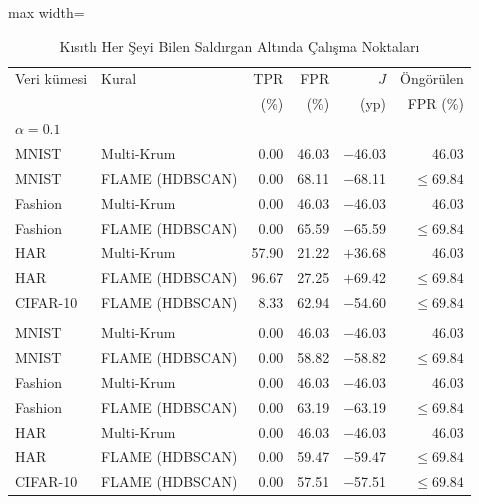 \begin{table}[!t]
\centering\footnotesize
\setlength{\tabcolsep}{4pt}
\caption{Kısıtlı Her Şeyi Bilen Saldırgan Altında Çalışma Noktaları}\label{tab:constrained}
\begin{adjustbox}{max width=\columnwidth}
\begin{tabular}{llrrrr}
\toprule
Veri kümesi & Kural & TPR & FPR & $J$ & Öngörülen \\
 &  & (\%) & (\%) & (yp) & FPR (\%) \\
\midrule
\multicolumn{6}{l}{\emph{$\alpha=0.1$}} \\
\quad MNIST & Multi-Krum & 0.00 & 46.03 & $-$46.03 & 46.03 \\
\quad MNIST & FLAME (HDBSCAN) & 0.00 & 68.11 & $-$68.11 & $\leq69.84$ \\
\quad Fashion & Multi-Krum & 0.00 & 46.03 & $-$46.03 & 46.03 \\
\quad Fashion & FLAME (HDBSCAN) & 0.00 & 65.59 & $-$65.59 & $\leq69.84$ \\
\quad HAR & Multi-Krum & 57.90 & 21.22 & $+$36.68 & 46.03 \\
\quad HAR & FLAME (HDBSCAN) & 96.67 & 27.25 & $+$69.42 & $\leq69.84$ \\
\quad CIFAR-10 & FLAME (HDBSCAN) & 8.33 & 62.94 & $-$54.60 & $\leq69.84$ \\
\addlinespace[3pt]
\multicolumn{6}{l}{\emph{$\alpha=0.01$}} \\
\quad MNIST & Multi-Krum & 0.00 & 46.03 & $-$46.03 & 46.03 \\
\quad MNIST & FLAME (HDBSCAN) & 0.00 & 58.82 & $-$58.82 & $\leq69.84$ \\
\quad Fashion & Multi-Krum & 0.00 & 46.03 & $-$46.03 & 46.03 \\
\quad Fashion & FLAME (HDBSCAN) & 0.00 & 63.19 & $-$63.19 & $\leq69.84$ \\
\quad HAR & Multi-Krum & 0.00 & 46.03 & $-$46.03 & 46.03 \\
\quad HAR & FLAME (HDBSCAN) & 0.00 & 59.47 & $-$59.47 & $\leq69.84$ \\
\quad CIFAR-10 & FLAME (HDBSCAN) & 0.00 & 57.51 & $-$57.51 & $\leq69.84$ \\
\bottomrule
\end{tabular}
\end{adjustbox}


\end{table}
